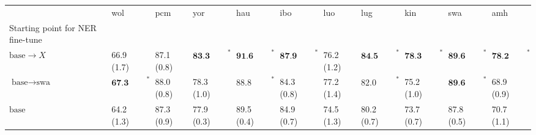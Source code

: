 \begin{tabular}{lllllllllll}
\toprule
{} &                      wol &         pcm &                      yor &                      hau &                      ibo &         luo &                      lug &                      kin &                      swa &                      amh \\
Starting point for NER fine-tune &                          &             &                          &                          &                          &             &                          &                          &                          &                          \\
\midrule
$\text{base} \to X$              &               66.9 (1.7) &  87.1 (0.8) &  $\textbf{83.3 (0.3)}^*$ &  $\textbf{91.6 (0.4)}^*$ &  $\textbf{87.9 (0.5)}^*$ &  76.2 (1.2) &  $\textbf{84.5 (0.5)}^*$ &  $\textbf{78.3 (1.0)}^*$ &  $\textbf{89.6 (0.6)}^*$ &  $\textbf{78.2 (0.8)}^*$ \\
$\text{base} \to \text{swa}$     &  $\textbf{67.3 (1.3)}^*$ &  88.0 (0.8) &               78.3 (1.0) &    $\text{88.8 (0.2)}^*$ &               84.3 (0.8) &  77.2 (1.4) &    $\text{82.0 (0.5)}^*$ &               75.2 (1.0) &  $\textbf{89.6 (0.6)}^*$ &               68.9 (0.9) \\
$\text{base}$                    &               64.2 (1.3) &  87.3 (0.9) &               77.9 (0.3) &               89.5 (0.4) &               84.9 (0.7) &  74.5 (1.3) &               80.2 (0.7) &               73.7 (0.7) &               87.8 (0.5) &               70.7 (1.1) \\
\bottomrule
\end{tabular}
